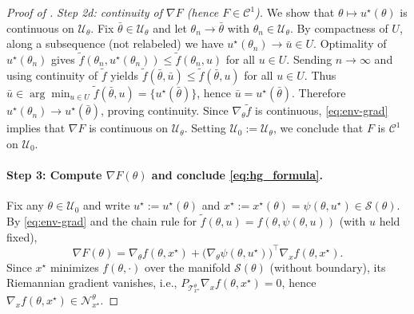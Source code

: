 \documentclass{article}
\theoremstyle{normaltheorem}
\newcommand{\calS}{\mathcal{S}}
\newcommand{\calT}{\mathcal{T}}
\newcommand{\calN}{\mathcal{N}}
\begin{document}
\begin{proof}[Proof of ]
			\emph{Step 2d: continuity of $\nabla F$ (hence $F\in\mathcal{C}^{1}$).}
			We show that $\theta\mapsto u^\star(\theta)$ is continuous on $\mathcal U_\theta$.
			Fix $\bar\theta\in\mathcal U_\theta$ and let $\theta_n\to\bar\theta$ with $\theta_n\in\mathcal U_\theta$.
			By compactness of $U$, along a subsequence (not relabeled) we have $u^\star(\theta_n)\to \bar u\in U$.
			Optimality of $u^\star(\theta_n)$ gives $\tilde f(\theta_n,u^\star(\theta_n))\le \tilde f(\theta_n,u)$ for all $u\in U$.
			Sending $n\to\infty$ and using continuity of $\tilde f$ yields $\tilde f(\bar\theta,\bar u)\le \tilde f(\bar\theta,u)$ for all $u\in U$.
			Thus $\bar u\in\arg\min_{u\in U}\tilde f(\bar\theta,u)=\{u^\star(\bar\theta)\}$, hence $\bar u=u^\star(\bar\theta)$.
			Therefore $u^\star(\theta_n)\to u^\star(\bar\theta)$, proving continuity.
			Since $\nabla_\theta\tilde f$ is continuous, \eqref{eq:env-grad} implies that $\nabla F$ is continuous on $\mathcal U_\theta$.
			Setting $\mathcal U_0:=\mathcal U_\theta$, we conclude that $F$ is $\mathcal{C}^{1}$ on $\mathcal U_0$.

			\paragraph{Step 3: Compute $\nabla F(\theta)$ and conclude \eqref{eq:hg_formula}.}
			Fix any $\theta\in\mathcal U_0$ and write $u^\star:=u^\star(\theta)$ and $x^\star:=x^\star(\theta)=\psi(\theta,u^\star)\in\calS(\theta)$.
		By \eqref{eq:env-grad} and the chain rule for $\tilde f(\theta,u)=f(\theta,\psi(\theta,u))$ (with $u$ held fixed),
		\[
		\nabla F(\theta)
		=
		\nabla_\theta f(\theta,x^\star)
		+
		\big(\nabla_\theta \psi(\theta,u^\star)\big)^\top \nabla_x f(\theta,x^\star).
		\]
		Since $x^\star$ minimizes $f(\theta,\cdot)$ over the manifold $\calS(\theta)$ (without boundary),
		its Riemannian gradient vanishes, i.e.,
		$P_{\calT_{x^\star}^\theta}\nabla_x f(\theta,x^\star)=0$, hence $\nabla_x f(\theta,x^\star)\in \calN_{x^\star}^\theta$.
		

\end{proof}
\end{document}
